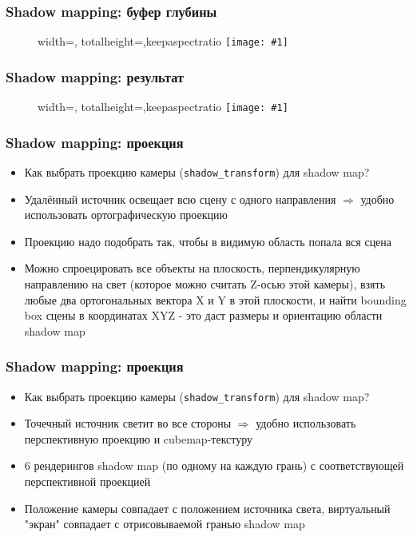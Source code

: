 \documentclass{beamer}
\newcommand{\slideimage}[1]{
  \begin{figure}
    \begin{adjustbox}{width=\textwidth, totalheight=\textheight-2\baselineskip-2\baselineskip,keepaspectratio}
      \texttt{[image: \#1]}
    \end{adjustbox}
  \end{figure}
}
\begin{document}
\begin{frame}[fragile]
\frametitle{Shadow mapping: буфер глубины}
\slideimage{shadow-mapping-depth.png}
\end{frame}

\begin{frame}[fragile]
\frametitle{Shadow mapping: результат}
\slideimage{shadow-mapping2.png}
\end{frame}

\begin{frame}[fragile]
\frametitle{Shadow mapping: проекция}
\begin{itemize}
\item Как выбрать проекцию камеры (\verb|shadow_transform|) для shadow map?
\pause
\item Удалённый источник освещает всю сцену с одного направления \begin{math}\Rightarrow\end{math} удобно использовать ортографическую проекцию
\pause
\item Проекцию надо подобрать так, чтобы в видимую область попала вся сцена
\pause
\item Можно спроецировать все объекты на плоскость, перпендикулярную направлению на свет (которое можно считать Z-осью этой камеры), взять любые два ортогональных вектора X и Y в этой плоскости, и найти bounding box сцены в координатах XYZ - это даст размеры и ориентацию области shadow map
\end{itemize}
\end{frame}

\begin{frame}[fragile]
\frametitle{Shadow mapping: проекция}
\begin{itemize}
\item Как выбрать проекцию камеры (\verb|shadow_transform|) для shadow map?
\pause
\item Точечный источник светит во все стороны \begin{math}\Rightarrow\end{math} удобно использовать перспективную проекцию и cubemap-текстуру
\pause
\item 6 рендерингов shadow map (по одному на каждую грань) с соответствующей перспективной проекцией
\pause
\item Положение камеры совпадает с положением источника света, виртуальный "экран"{} совпадает с отрисовываемой гранью shadow map
\end{itemize}
\end{frame}
\end{document}
